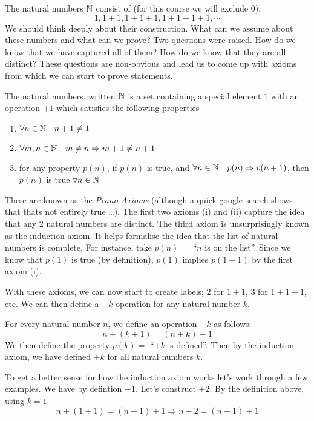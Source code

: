 \documentclass{article}
\begin{document}
The natural numbers $\mathbb{N}$ consist of (for this course we will exclude 0):
\[
    1, 1+1, 1+1+1, 1+1+1+1, \cdots 
\]
We should think deeply about their construction. What can we assume about these numbers and what can we prove? Two questions were raised. How do we know that we have captured all of them? How do we know that they are all distinct? These questions are non-obvious and lead us to come up with axioms from which we can start to prove statements.

\begin{defi}
    The natural numbers, written $\mathbb{N}$ is a set containing a special element $1$ with an operation $+1$ which satisfies the following properties
    \begin{enumerate}
        \item $\forall n \in \mathbb{N} \quad n+1 \neq 1$
        \item $\forall m, n \in \mathbb{N} \quad  m \neq n \Rightarrow m + 1 \neq n + 1$
        \item for any property $p(n)$, if $p(n)$ is true, and $\forall n \in \mathbb{N} \quad p(n) \Rightarrow p(n + 1)$, then $p(n)$ is true $\forall n \in \mathbb{N}$
    \end{enumerate}
\end{defi}

These are known as the \emph{Peano Axioms} (although a quick google search shows that thats not entirely true \ldots). The first two axioms (i) and (ii) capture the idea that any 2 natural numbers are distinct. The third axiom is unsurprisingly known as the induction axiom. It helps formalise the idea that the list of natural numbers is complete. For instance, take $p(n) = $ ``$n$ is on the list''. Since we know that $p(1)$ is true (by definition), $p(1)$ implies $p(1 + 1)$ by the first axiom (i).

With these axioms, we can now start to create labels; $2$ for $1 + 1$, $3$ for $1 + 1 + 1$, etc. We can then define a $+k$ operation for any natural number $k$.

\begin{defi}[$+k$]
    For every natural number $n$, we define an operation $+k$ as follows:
    \[
        n + (k + 1) = (n + k) + 1
    \]
    We then define the property $p(k) = $ ``$+k$ is defined''. Then by the induction axiom, we have defined $+k$ for all natural numbers $k$.
\end{defi}

To get a better sense for how the induction axiom works let's work through a few examples. We have by defintion $+1$. Let's construct $+2$. By the definition above, using $k = 1$
\[
    n + (1 + 1) = (n + 1) + 1 \Rightarrow n + 2 = (n + 1) + 1
\]
\end{document}
